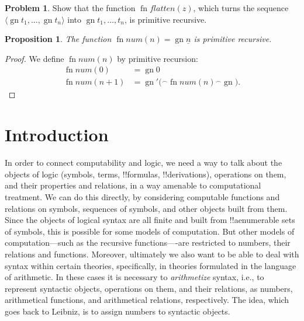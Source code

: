 \documentclass[10pt,a4paper]{article}
\theoremstyle{plain}
\newtheorem{prop}[thm]{Proposition}
\theoremstyle{definition}
\newtheorem{prob}{Problem}[section]
\theoremstyle{remark}
\newcommand*{\olfileid}[3]{}
\newcommand*{\olsection}[1]{\section*{#1}}
\newcommand*{\ollabel}[1]{\label{#1}}
\providecommand{\Obj}{}
\providecommand{\tuple}[1]{\langle #1 \rangle}
\providecommand{\num}[1]{\underline{#1}}
\providecommand{\concat}{\mathbin{{}^\frown}}
\providecommand{\Gn}{\operatorname{gn}}
\providecommand{\fn}{\operatorname{fn}}
\providecommand{\fn}{\operatorname{fn}}
\begin{document}
\begin{prob}
Show that the function $\fn{flatten}(z)$, which turns the sequence
$\tuple{\Gn{t_1}, \dots, \Gn{t_n}}$ into $\Gn{t_1, \dots, t_n}$, is
primitive recursive.
\end{prob}

\begin{prop}\ollabel{prop:num-primrec}
  The function $\fn{num}(n) = \Gn{\num{n}}$ is primitive recursive.
\end{prop}

\begin{proof}
  We define $\fn{num}(n)$ by primitive recursion:
  \begin{align*}
    \fn{num}(0) & = \Gn{\Obj 0}\\
    \fn{num}(n+1) & = \Gn{\prime(} \concat \fn{num}(n) \concat \Gn{)}.
  \end{align*}
\end{proof}





\olfileid{inc}{art}{int}
\olsection{Introduction}

In order to connect computability and logic, we need a way to talk
about the objects of logic (symbols, terms, !!{formula}s,
!!{derivation}s), operations on them, and their properties and
relations, in a way amenable to computational treatment.  We can do
this directly, by considering computable functions and relations on
symbols, sequences of symbols, and other objects built from them.
Since the objects of logical syntax are all finite and built from
!!a{enumerable} sets of symbols, this is possible for some models of
computation.  But other models of computation---such as the recursive
functions----are restricted to numbers, their relations and functions.
Moreover, ultimately we also want to be able to deal with syntax
within certain theories, specifically, in theories formulated in the
language of arithmetic.  In these cases it is necessary to
\emph{arithmetize} syntax, i.e., to represent syntactic objects,
operations on them, and their relations, as numbers, arithmetical
functions, and arithmetical relations, respectively. The idea, which
goes back to Leibniz, is to assign numbers to syntactic objects.
\end{document}
